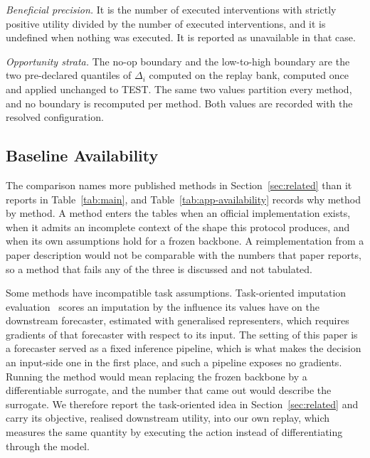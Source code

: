 \documentclass{article}
\begin{document}
\emph{Beneficial precision.} It is the number of executed interventions with strictly positive
utility divided by the number of executed interventions, and it is undefined when nothing was
executed. It is reported as unavailable in that case.

\emph{Opportunity strata.} The no-op boundary and the low-to-high boundary are the two
pre-declared quantiles of $\Delta_i$ computed on the replay bank, computed once and applied
unchanged to TEST. The same two values partition every method, and no boundary is recomputed
per method. Both values are recorded with the resolved configuration.

\subsection{Baseline Availability}
\label{app:baseline-availability}
The comparison names more published methods in Section~\ref{sec:related} than it reports in
Table~\ref{tab:main}, and Table~\ref{tab:app-availability} records why method by method. A
method enters the tables when an official implementation exists, when it admits an incomplete
context of the shape this protocol produces, and when its own assumptions hold for a frozen
backbone. A reimplementation from a paper description would not be comparable with the numbers
that paper reports, so a method that fails any of the three is discussed and not tabulated.

Some methods have incompatible task assumptions. Task-oriented imputation
evaluation~\citep{wang2024taskoriented} scores an imputation by the influence its values have
on the downstream forecaster, estimated with generalised representers, which requires gradients
of that forecaster with respect to its input. The setting of this paper is a forecaster served
as a fixed inference pipeline, which is what makes the decision an input-side one in the first
place, and such a pipeline exposes no gradients. Running the method would mean replacing the
frozen backbone by a differentiable surrogate, and the number that came out would describe the
surrogate. We therefore report the task-oriented idea in Section~\ref{sec:related} and carry
its objective, realised downstream utility, into our own replay, which measures the same
quantity by executing the action instead of differentiating through the model.
\end{document}
